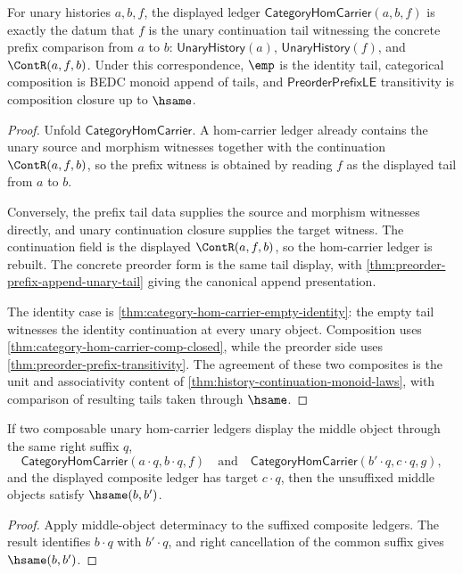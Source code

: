 \begin{theorem}
\label{thm:unary-prefix-preorder-category-correspondence}
For unary histories $a,b,f$, the displayed ledger
$\mathsf{CategoryHomCarrier}(a,b,f)$ is exactly the datum that $f$ is the
unary continuation tail witnessing the concrete prefix comparison from $a$ to
$b$: $\mathsf{UnaryHistory}(a)$, $\mathsf{UnaryHistory}(f)$, and
$\ContR(a,f,b)$. Under this correspondence, $\emp$ is the identity tail,
categorical composition is BEDC monoid append of tails, and
$\mathsf{PreorderPrefixLE}$ transitivity is composition closure up to
$\hsame$.
\end{theorem}
\begin{proof}
Unfold $\mathsf{CategoryHomCarrier}$. A hom-carrier ledger already contains
the unary source and morphism witnesses together with the continuation
$\ContR(a,f,b)$, so the prefix witness is obtained by reading $f$ as the
displayed tail from $a$ to $b$.

Conversely, the prefix tail data supplies the source and morphism witnesses
directly, and unary continuation closure supplies the target witness. The
continuation field is the displayed $\ContR(a,f,b)$, so the hom-carrier ledger
is rebuilt. The concrete preorder form is the same tail display, with
\autoref{thm:preorder-prefix-append-unary-tail} giving the canonical append
presentation.

The identity case is \autoref{thm:category-hom-carrier-empty-identity}: the
empty tail witnesses the identity continuation at every unary object.
Composition uses \autoref{thm:category-hom-carrier-comp-closed}, while the
preorder side uses \autoref{thm:preorder-prefix-transitivity}. The agreement
of these two composites is the unit and associativity content of
\autoref{thm:history-continuation-monoid-laws}, with comparison of resulting
tails taken through $\hsame$.
\end{proof}

\begin{theorem}
\label{thm:category-hom-carrier-append-suffix-comp-middle-object-deterministic}
If two composable unary hom-carrier ledgers display the middle object through
the same right suffix $q$,
$$
\mathsf{CategoryHomCarrier}(a\cdot q,b\cdot q,f)
\quad\text{and}\quad
\mathsf{CategoryHomCarrier}(b'\cdot q,c\cdot q,g),
$$
and the displayed composite ledger has target $c\cdot q$, then the unsuffixed
middle objects satisfy $\hsame(b,b')$.
\end{theorem}
\begin{proof}
Apply middle-object determinacy to the suffixed composite ledgers. The result
identifies $b\cdot q$ with $b'\cdot q$, and right cancellation of the common
suffix gives $\hsame(b,b')$.
\end{proof}


